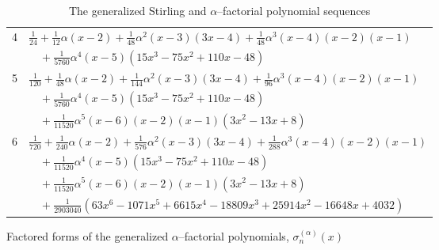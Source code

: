 \documentclass[12pt,reqno]{article}
\numberwithin{sfootnote}{section}
\newcommand{\subtablewidth}{\textwidth}
\numberwithin{equation}{section}
\theoremstyle{plain}
\theoremstyle{definition}
\theoremstyle{remark}
\begin{document}
\begin{table}[h]
\begin{subtable}{\subtablewidth}
\begin{tabular}{|c|l|}
4 & $\frac{1}{24} + 
     \frac{1}{12} \alpha  (x-2) + 
     \frac{1}{48} \alpha ^2 (x-3) (3 x-4)+
     \frac{1}{48} \alpha ^3 (x-4) (x-2) (x-1)$ \\ 
  & $\quad + 
     \frac{1}{5760}\alpha ^4 (x-5) \left(15 x^3-75 x^2+110 x-48\right)$ \\ 
5 & $\frac{1}{120} + 
     \frac{1}{48} \alpha  (x-2) + 
     \frac{1}{144} \alpha ^2 (x-3) (3 x-4)+
     \frac{1}{96} \alpha ^3 (x-4) (x-2) (x-1)$ \\ 
  & $\quad + 
     \frac{1}{5760}\alpha ^4 (x-5) \left(15 x^3-75 x^2+110 x-48\right)$ \\ 
  & $\quad + 
     \frac{1}{11520}\alpha ^5 (x-6) (x-2) (x-1) \left(3 x^2-13 x+8\right)$ \\ 
6 & $\frac{1}{720} + 
     \frac{1}{240} \alpha  (x-2) + 
     \frac{1}{576} \alpha ^2 (x-3) (3 x-4)+
     \frac{1}{288} \alpha ^3 (x-4) (x-2) (x-1)$ \\ 
  & $\quad + 
     \frac{1}{11520}\alpha ^4 (x-5) \left(15 x^3-75 x^2+110 x-48\right)$ \\ 
  & $\quad + 
     \frac{1}{11520}\alpha ^5 (x-6) (x-2) (x-1) \left(3 x^2-13 x+8\right)$ \\ 
  & $\quad + 
     \frac{1}{2903040}\left( 
     63 x^6-1071 x^5+6615 x^4-18809 x^3+25914 x^2-16648 x+ 4032\right)$ \\ 
     \hline\hline 
\end{tabular} 

\caption{Factored forms of the generalized $\alpha$--factorial polynomials, 
         $\sigma_n^{(\alpha)}(x)$} 

\end{subtable} 

\caption{The generalized Stirling and $\alpha$--factorial 
         polynomial sequences} 
\label{table_GenStirlingAlphaCvlPolys} 

\end{table} 
\end{document}
